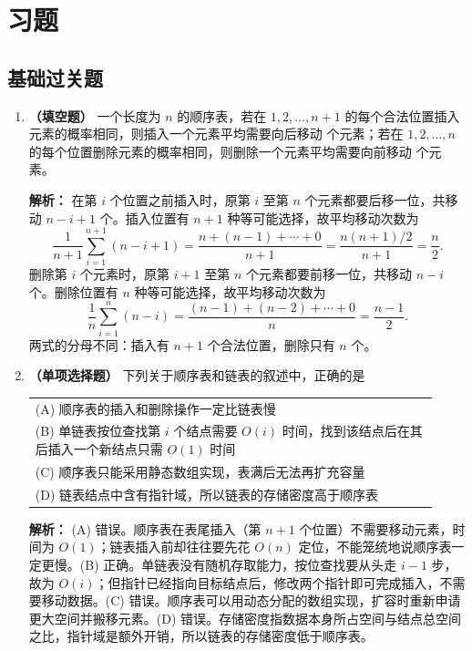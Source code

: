 \section{习题}

\subsection{基础过关题}

\begin{enumerate}

\item \textbf{（填空题）} 一个长度为 $n$ 的顺序表，若在 $1,2,\ldots,n+1$ 的每个合法位置插入元素的概率相同，则插入一个元素平均需要向后移动 \underline{\qquad\qquad} 个元素；若在 $1,2,\ldots,n$ 的每个位置删除元素的概率相同，则删除一个元素平均需要向前移动 \underline{\qquad\qquad} 个元素。

\ifshowsolutions\par\noindent\textbf{解析：} 在第 $i$ 个位置之前插入时，原第 $i$ 至第 $n$ 个元素都要后移一位，共移动 $n-i+1$ 个。插入位置有 $n+1$ 种等可能选择，故平均移动次数为
\[
\frac{1}{n+1}\sum_{i=1}^{n+1}(n-i+1)
=\frac{n+(n-1)+\cdots+0}{n+1}
=\frac{n(n+1)/2}{n+1}
=\frac{n}{2}.
\]
删除第 $i$ 个元素时，原第 $i+1$ 至第 $n$ 个元素都要前移一位，共移动 $n-i$ 个。删除位置有 $n$ 种等可能选择，故平均移动次数为
\[
\frac{1}{n}\sum_{i=1}^{n}(n-i)
=\frac{(n-1)+(n-2)+\cdots+0}{n}
=\frac{n-1}{2}.
\]
两式的分母不同：插入有 $n+1$ 个合法位置，删除只有 $n$ 个。\else \answerarea \fi

\item \textbf{（单项选择题）} 下列关于顺序表和链表的叙述中，正确的是

\begin{center}
\begin{tabular}{p{0.92\linewidth}}
(A) 顺序表的插入和删除操作一定比链表慢 \\[4pt]
(B) 单链表按位查找第 $i$ 个结点需要 $O(i)$ 时间，找到该结点后在其后插入一个新结点只需 $O(1)$ 时间 \\[4pt]
(C) 顺序表只能采用静态数组实现，表满后无法再扩充容量 \\[4pt]
(D) 链表结点中含有指针域，所以链表的存储密度高于顺序表 \\
\end{tabular}
\end{center}

\ifshowsolutions\par\noindent\textbf{解析：} (A) 错误。顺序表在表尾插入（第 $n+1$ 个位置）不需要移动元素，时间为 $O(1)$；链表插入前却往往要先花 $O(n)$ 定位，不能笼统地说顺序表一定更慢。(B) 正确。单链表没有随机存取能力，按位查找要从头走 $i-1$ 步，故为 $O(i)$；但指针已经指向目标结点后，修改两个指针即可完成插入，不需要移动数据。(C) 错误。顺序表可以用动态分配的数组实现，扩容时重新申请更大空间并搬移元素。(D) 错误。存储密度指数据本身所占空间与结点总空间之比，指针域是额外开销，所以链表的存储密度低于顺序表。\else \answerarea \fi


\end{enumerate}
